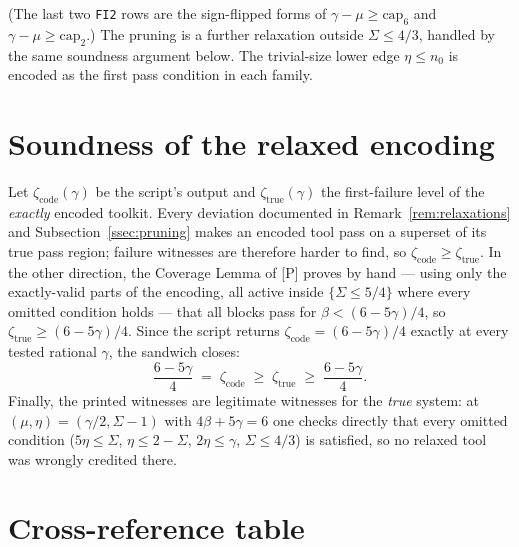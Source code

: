 \documentclass[11pt]{article}
\theoremstyle{remark}
\newcommand{\code}[1]{\texttt{#1}}
\begin{document}
\noindent(The last two \code{FI2} rows are the sign-flipped forms of
$\gamma-\mu\ge\mathrm{cap}_6$ and $\gamma-\mu\ge\mathrm{cap}_2$.) The
pruning is a further relaxation outside $\Sigma\le4/3$, handled by the
same soundness argument below. The trivial-size lower edge $\eta\le
n_0$ is encoded as the first pass condition in each family.

\section{Soundness of the relaxed encoding}\label{sec:soundness}

Let $\zeta_{\mathrm{code}}(\gamma)$ be the script's output and
$\zeta_{\mathrm{true}}(\gamma)$ the first-failure level of the
\emph{exactly} encoded toolkit. Every deviation documented in
Remark~\ref{rem:relaxations} and Subsection~\ref{ssec:pruning} makes an
encoded tool pass on a superset of its true pass region; failure
witnesses are therefore harder to find, so
$\zeta_{\mathrm{code}}\ge\zeta_{\mathrm{true}}$. In the other
direction, the Coverage Lemma of [P] proves by hand --- using only the
exactly-valid parts of the encoding, all active inside
$\{\Sigma\le5/4\}$ where every omitted condition holds --- that all
blocks pass for $\beta<(6-5\gamma)/4$, so
$\zeta_{\mathrm{true}}\ge(6-5\gamma)/4$. Since the script returns
$\zeta_{\mathrm{code}}=(6-5\gamma)/4$ exactly at every tested rational
$\gamma$, the sandwich closes:
\[
\frac{6-5\gamma}{4}\;=\;\zeta_{\mathrm{code}}
\;\ge\;\zeta_{\mathrm{true}}\;\ge\;\frac{6-5\gamma}{4}.
\]
Finally, the printed witnesses are legitimate witnesses for the
\emph{true} system: at $(\mu,\eta)=(\gamma/2,\Sigma-1)$ with
$4\beta+5\gamma=6$ one checks directly that every omitted condition
($5\eta\le\Sigma$, $\eta\le2-\Sigma$, $2\eta\le\gamma$,
$\Sigma\le4/3$) is satisfied, so no relaxed tool was wrongly credited
there.

\section{Cross-reference table}\label{sec:xref}
\end{document}
